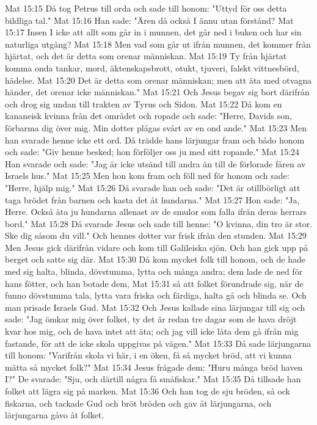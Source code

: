 Mat 15:15  Då tog Petrus till orda och sade till honom: "Uttyd för oss detta bildliga tal."
Mat 15:16  Han sade: "Ären då också I ännu utan förstånd?
Mat 15:17  Insen I icke att allt som går in i munnen, det går ned i buken och har sin naturliga utgång?
Mat 15:18  Men vad som går ut ifrån munnen, det kommer från hjärtat, och det är detta som orenar människan.
Mat 15:19  Ty från hjärtat komma onda tankar, mord, äktenskapsbrott, otukt, tjuveri, falskt vittnesbörd, hädelse.
Mat 15:20  Det är detta som orenar människan; men att äta med otvagna händer, det orenar icke människan."
Mat 15:21  Och Jesus begav sig bort därifrån och drog sig undan till trakten av Tyrus och Sidon.
Mat 15:22  Då kom en kananeisk kvinna från det området och ropade och sade: "Herre, Davids son, förbarma dig över mig. Min dotter plågas svårt av en ond ande."
Mat 15:23  Men han svarade henne icke ett ord. Då trädde hans lärjungar fram och bådo honom och sade: "Giv henne besked; hon förföljer oss ju med sitt ropande."
Mat 15:24  Han svarade och sade: "Jag är icke utsänd till andra än till de förlorade fåren av Israels hus."
Mat 15:25  Men hon kom fram och föll ned för honom och sade: "Herre, hjälp mig."
Mat 15:26  Då svarade han och sade: "Det är otillbörligt att taga brödet från barnen och kasta det åt hundarna."
Mat 15:27  Hon sade: "Ja, Herre. Också äta ju hundarna allenast av de smulor som falla ifrån deras herrars bord."
Mat 15:28  Då svarade Jesus och sade till henne: "O kvinna, din tro är stor. Ske dig såsom du vill." Och hennes dotter var frisk ifrån den stunden.
Mat 15:29  Men Jesus gick därifrån vidare och kom till Galileiska sjön. Och han gick upp på berget och satte sig där.
Mat 15:30  Då kom mycket folk till honom, och de hade med sig halta, blinda, dövstumma, lytta och många andra; dem lade de ned för hans fötter, och han botade dem,
Mat 15:31  så att folket förundrade sig, när de funno dövstumma tala, lytta vara friska och färdiga, halta gå och blinda se. Och man prisade Israels Gud.
Mat 15:32  Och Jesus kallade sina lärjungar till sig och sade: "Jag ömkar mig över folket, ty det är redan tre dagar som de hava dröjt kvar hos mig, och de hava intet att äta; och jag vill icke låta dem gå ifrån mig fastande, för att de icke skola uppgivas på vägen."
Mat 15:33  Då sade lärjungarna till honom: "Varifrån skola vi här, i en öken, få så mycket bröd, att vi kunna mätta så mycket folk?"
Mat 15:34  Jesus frågade dem: "Huru många bröd haven I?" De svarade: "Sju, och därtill några få småfiskar."
Mat 15:35  Då tillsade han folket att lägra sig på marken.
Mat 15:36  Och han tog de sju bröden, så ock fiskarna, och tackade Gud och bröt bröden och gav åt lärjungarna, och lärjungarna gåvo åt folket.
